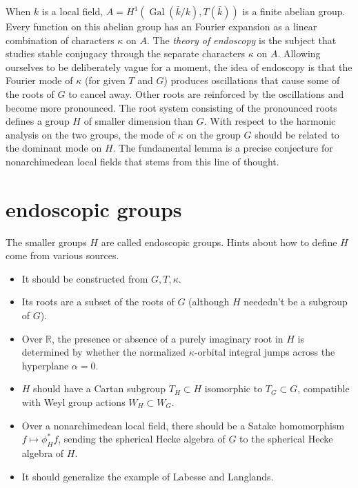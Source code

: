 \documentclass[brochure,english,12pt]{bourbaki}
\def\op#1{{\operatorname{#1}}}
\newcommand{\ring}[1]{\mathbb{#1}}
\begin{document}
When $k$ is a local field, $A=H^1(\op{Gal}(\bar k/k),T(\bar k))$ is a
finite abelian group.  Every function on this abelian group has an
Fourier expansion as a linear combination of characters $\kappa$ on
$A$.  
The {\it theory of endoscopy}
is the subject that studies stable conjugacy through the separate
characters $\kappa$ on $A$.  Allowing ourselves to be deliberately
vague for a moment, the idea of endoscopy is that the Fourier mode of
$\kappa$ (for given $T$ and $G$) produces oscillations that cause some
of the roots of $G$ to cancel away.  Other roots are
reinforced by the oscillations and become more pronounced.  The root
system consisting of the pronounced roots defines a group $H$ of smaller
dimension than $G$.  With respect to the harmonic analysis on the two
groups, the mode of $\kappa$ on the group $G$ should
be related to the dominant mode on $H$.  The fundamental lemma is a precise
conjecture for nonarchimedean local fields that stems from this line of thought.





\section{endoscopic groups}

The
smaller groups $H$ are called endoscopic groups.
Hints about how to define $H$ come from various sources.
\begin{itemize}
\item It should be constructed from $G,T,\kappa$.
\item Its roots are a subset of the roots of $G$ (although $H$ neededn't
be a subgroup of $G$).
\item Over $\ring{R}$, the presence or absence of a purely imaginary
root in $H$ is determined by whether the normalized $\kappa$-orbital
integral jumps across the hyperplane $\alpha=0$.
\item $H$ should have a Cartan subgroup $T_H\subset H$ isomorphic to
$T_G\subset G$, compatible with Weyl group actions $W_H\subset W_G$.
\item Over a nonarchimedean local field, there should be a Satake
homomorphism $f \mapsto \phi^*_Hf$, sending the spherical Hecke algebra
of $G$ to the spherical Hecke algebra of $H$.
\item It should generalize the example of Labesse and Langlands.
\end{itemize}
\end{document}
